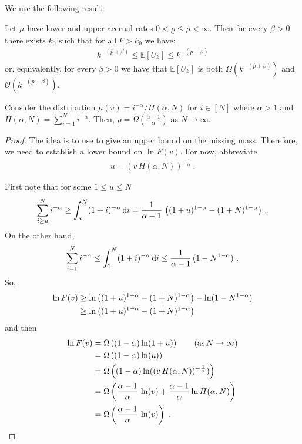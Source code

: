 We use the following result:
\begin{lemma}
  \label{lem:missing-mass-accrual-bounds}
  Let \(\mu\) have lower and upper accrual rates \(0 < \underline{\rho} \leq \overline{\rho} < \infty\). Then for every \(\beta > 0\) there exists \(k_0\) such that for all \(k > k_0\) we have:
  \begin{align*}
    k^{-(\overline{p}+\beta)} \leq \mathbb{E}[U_k] \leq k^{-(\underline{p}-\beta)}
  \end{align*}
or, equivalently, for every \(\beta > 0\) we have that \(\mathbb{E}[U_k]\) is both \(\Omega(k^{-(\overline{p}+\beta)})\) and \(\mathcal{O}(k^{-(\underline{p}-\beta)})\).

\end{lemma}
%
\begin{proposition}
  \label{prop:zipf}
  Consider the distribution $\mu(v) = i^{-\alpha} / H(\alpha, N)$ for $i \in [N]$ where $\alpha > 1$ and $H(\alpha, N) = \sum_{i=1}^N i^{-\alpha}$.
  Then, $\underline{\rho} = \Omega(\frac{\alpha-1}{\alpha})$ as $N \to \infty$.
\end{proposition}
\begin{proof}
  The idea is to use  to give an upper bound on
  the missing mass. Therefore, we need to establish a lower bound on $\ln F(v)$.
  For now, abbreviate
  \begin{align*}
    u = (v \, H(\alpha, N))^{-\frac{1}{\alpha}}~.
  \end{align*}

  First note that for some $1 \leq u \leq N$
  \begin{align*}
    \sum_{i \geq u}^N i^{-\alpha} \geq \int_{u}^N (1+i)^{-\alpha} \mathop{}\!\mathrm{d} i
    =
    \frac{1}{\alpha - 1} \, \left(  (1+u)^{1-\alpha} - (1 + N)^{1-\alpha}  \right)~.
  \end{align*}
%
  On the other hand,
  \begin{align*}
    \sum_{i=1}^N i^{-\alpha} \leq \int_{1}^N (1+i)^{-\alpha} \mathop{}\!\mathrm{d} i
    \leq
    \frac{1}{\alpha - 1} \, ( 1 - N^{1-\alpha} )~.
  \end{align*}
%
  So,
  \begin{align*}
    \ln F(v)
    &\geq
    \ln\left( 
    (1 + u)^{1-\alpha} - (1 + N)^{1-\alpha}
     \right)
      - \ln(1 - N^{1-\alpha})\\
    &\geq
    \ln\left( 
      (1 + u)^{1-\alpha} - (1 + N)^{1-\alpha}
     \right)
  \end{align*}
and then
  \begin{align*}
    \ln F(v)
    &= \Omega\left( (1-\alpha) \ln(1 + u) \right) \qquad (\text{as} \, N \to \infty)\\
    &= \Omega\left( (1-\alpha) \ln(u) \right) \\
    &= \Omega\left( (1-\alpha) \ln((v \, H(\alpha, N))^{-\frac{1}{\alpha}}) \right) \\
    &= \Omega\left( \frac{\alpha-1}{\alpha} \, \ln(v) + \frac{\alpha-1}{\alpha} \ln H(\alpha, N) \right) \\
    &= \Omega\left( \frac{\alpha-1}{\alpha} \, \ln(v) \right)~.
  \end{align*}
%
\end{proof}

